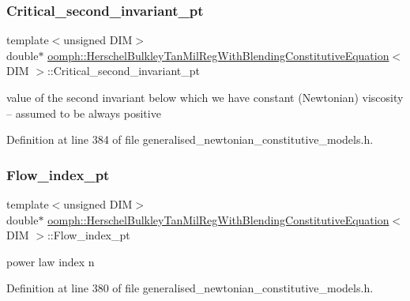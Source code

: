 \subsubsection{\texorpdfstring{Critical\+\_\+second\+\_\+invariant\+\_\+pt}{Critical\_second\_invariant\_pt}}
{\footnotesize\ttfamily template$<$unsigned D\+IM$>$ \\
double$\ast$ \hyperlink{classoomph_1_1HerschelBulkleyTanMilRegWithBlendingConstitutiveEquation}{oomph\+::\+Herschel\+Bulkley\+Tan\+Mil\+Reg\+With\+Blending\+Constitutive\+Equation}$<$ D\+IM $>$\+::Critical\+\_\+second\+\_\+invariant\+\_\+pt\hspace{0.3cm}{\ttfamily [private]}}

value of the second invariant below which we have constant (Newtonian) viscosity -- assumed to be always positive 

Definition at line 384 of file generalised\+\_\+newtonian\+\_\+constitutive\+\_\+models.\+h.

\mbox{\label{classoomph_1_1HerschelBulkleyTanMilRegWithBlendingConstitutiveEquation_a2e1af77859cb590e608fd0d47d5ce366}} 
\subsubsection{\texorpdfstring{Flow\+\_\+index\+\_\+pt}{Flow\_index\_pt}}
{\footnotesize\ttfamily template$<$unsigned D\+IM$>$ \\
double$\ast$ \hyperlink{classoomph_1_1HerschelBulkleyTanMilRegWithBlendingConstitutiveEquation}{oomph\+::\+Herschel\+Bulkley\+Tan\+Mil\+Reg\+With\+Blending\+Constitutive\+Equation}$<$ D\+IM $>$\+::Flow\+\_\+index\+\_\+pt\hspace{0.3cm}{\ttfamily [private]}}



power law index n 



Definition at line 380 of file generalised\+\_\+newtonian\+\_\+constitutive\+\_\+models.\+h.

